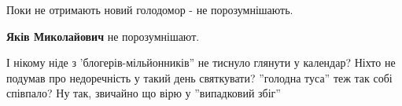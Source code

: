 \begin{itemize}
Поки не отримають новий голодомор - не порозумнішають.

\textbf{Яків Миколайович} не порозумнішают.


І нікому ніде з 'блогерів-мільйонників'' не тиснуло глянути у календар? Ніхто
не подумав про недоречність у такий день святкувати? ''голодна туса'' теж так
собі співпало? Ну так, звичайно що вірю у ''випадковий збіг''

\end{itemize} %
